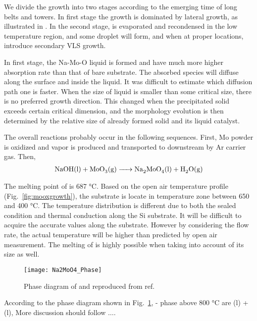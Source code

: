 We divide the growth into two stages according to the emerging time of long belts and towers. In first stage the growth is dominated by lateral growth, as illustrated in . In the second stage,  is evaporated and recondensed in the low temperature region, and some droplet will form, and when at proper locations, introduce secondary VLS growth.

In first stage, the Na-Mo-O liquid is formed and have much more higher absorption rate than that of bare substrate. The absorbed species will diffuse along the surface and inside the liquid. It was difficult to estimate which diffusion path one is faster. When the size of liquid is smaller than some critical size, there is no preferred growth direction. This changed when the precipitated solid exceeds certain critical dimension, and the morphology evolution is then determined by the relative size of already formed solid and its liquid catalyst.


The overall reactions probably occur in the following sequences.
First, Mo powder is oxidized and  vapor is produced and transported to downstream by Ar carrier gas. Then,
\begin{align}
\cee{NaOH(l) + MoO3(g) -> Na2MoO4(l) + H2O(g)}
\end{align}

The melting point of  is 687 \si{\degreeCelsius}. Based on the open air temperature profile (Fig.~\ref{fig:mooxgrowth}), the substrate is locate in temperature zone between 650 and 400 \si{\degreeCelsius}. The temperature distribution is different due to both the sealed condition and thermal conduction along the Si substrate. It will be difficult to acquire the accurate values along the substrate. However by considering the flow rate, the actual temperature will be higher than predicted by open air measurement.\cite{Subannajui2010} The melting of  is highly possible when taking into account of its size as well. \cite{Bruggemann1997}

\begin{figure}[htb]
\centering
\texttt{[image: Na2MoO4\_Phase]}
\caption[Phase diagram of Na-Mo-O]{Phase diagram of  and  reproduced from ref.~\cite{Hoermann1929}}
\label{fig:pd}
\end{figure}

According to the phase diagram shown in Fig.~\ref{fig:pd},  -  phase above 800 \si{\degreeCelsius} are (l) + (l), More discussion should follow $\ldots$.

